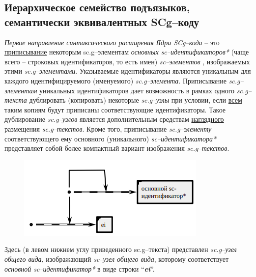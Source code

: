 \subsection{Иерархическое семейство подъязыков, семантически эквивалентных SCg--коду}



	
\textit{Первое направление синтаксического расширения Ядра SCg--кода} -- это \uline{приписывание} некоторым \mbox{sc.g--элементам} \textit{основных sc--идентификаторов*} (чаще всего -- строковых идентификаторов, то есть имен) \textit{sc--элементов} , изображаемых этими \textit{sc.g--элементами}. Указываемые идентификаторы являются уникальным для каждого идентифицируемого (именуемого) \textit{sc.g--элемента}. Приписывание \textit{sc.g--элементам} уникальных идентификаторов дает возможность в рамках одного \textit{sc.g--текста} дублировать (копировать) некоторые \textit{sc.g--узлы} при условии, если \uline{всем} таким копиям будут приписаны соответствующие идентификаторы. Такое дублирование \textit{sc.g--узлов} является дополнительным средствам \uline{наглядного} размещения \textit{sc.g--текстов}. Кроме того, приписывание \textit{sc.g--элементу} соответствующего ему основного (уникального) \textit{sc--идентификатора*} представляет собой более компактный вариант изображения \textit{sc.g--текстов}.

\begin{figure}[h]
	\centering
	\includegraphics[scale=0.8]{images/intro/scg/scg_transf1.png}
\end{figure}

Здесь (в левом нижнем углу приведенного sc.g--текста) представлен \textit{sc.g--узел общего вида}, изображающий \textit{sc--узел общего вида}, которому соответствует \textit{основной sc--идентификатор*} в виде строки ``\textbf{\textit{ei}}''.

